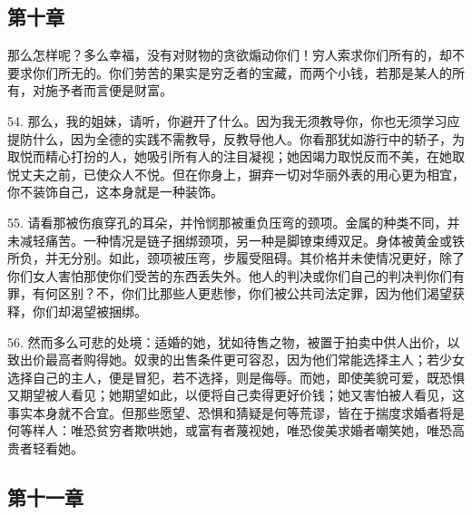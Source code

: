 \subsection{第十章}

\par

那么怎样呢？多么幸福，没有对财物的贪欲煽动你们！穷人索求你们所有的，却不要求你们所无的。你们劳苦的果实是穷乏者的宝藏，而两个小钱，若那是某人的所有，对施予者而言便是财富。\par

54. 那么，我的姐妹，请听，你避开了什么。因为我无须教导你，你也无须学习应提防什么，因为全德的实践不需教导，反教导他人。你看那犹如游行中的轿子，为取悦而精心打扮的人，她吸引所有人的注目凝视；她因竭力取悦反而不美，在她取悦丈夫之前，已使众人不悦。但在你身上，摒弃一切对华丽外表的用心更为相宜，你不装饰自己，这本身就是一种装饰。\par

55. 请看那被伤痕穿孔的耳朵，并怜悯那被重负压弯的颈项。金属的种类不同，并未减轻痛苦。一种情况是链子捆绑颈项，另一种是脚镣束缚双足。身体被黄金或铁所负，并无分别。如此，颈项被压弯，步履受阻碍。其价格并未使情况更好，除了你们女人害怕那使你们受苦的东西丢失外。他人的判决或你们自己的判决判你们有罪，有何区别？不，你们比那些人更悲惨，你们被公共司法定罪，因为他们渴望获释，你们却渴望被捆绑。\par

56. 然而多么可悲的处境：适婚的她，犹如待售之物，被置于拍卖中供人出价，以致出价最高者购得她。奴隶的出售条件更可容忍，因为他们常能选择主人；若少女选择自己的主人，便是冒犯，若不选择，则是侮辱。而她，即使美貌可爱，既恐惧又期望被人看见；她期望如此，以便将自己卖得更好价钱；她又害怕被人看见，这事实本身就不合宜。但那些愿望、恐惧和猜疑是何等荒谬，皆在于揣度求婚者将是何等样人：唯恐贫穷者欺哄她，或富有者蔑视她，唯恐俊美求婚者嘲笑她，唯恐高贵者轻看她。\par


\subsection{第十一章}

\par

